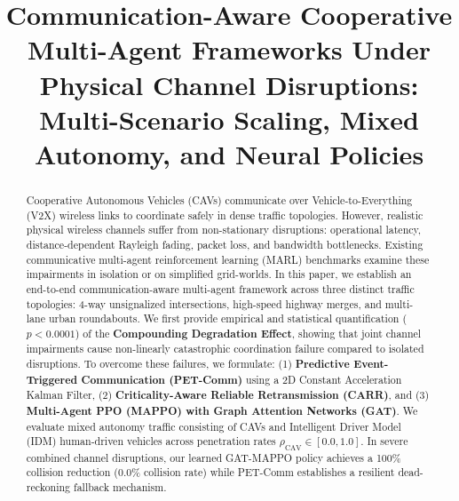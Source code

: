 \documentclass[conference]{IEEEtran}
\begin{document}
\title{Communication-Aware Cooperative Multi-Agent Frameworks Under Physical Channel Disruptions: Multi-Scenario Scaling, Mixed Autonomy, and Neural Policies}

\author{
\and
{}
}

\maketitle

\begin{abstract}
Cooperative Autonomous Vehicles (CAVs) communicate over Vehicle-to-Everything (V2X) wireless links to coordinate safely in dense traffic topologies. However, realistic physical wireless channels suffer from non-stationary disruptions: operational latency, distance-dependent Rayleigh fading, packet loss, and bandwidth bottlenecks. Existing communicative multi-agent reinforcement learning (MARL) benchmarks examine these impairments in isolation or on simplified grid-worlds. In this paper, we establish an end-to-end communication-aware multi-agent framework across three distinct traffic topologies: 4-way unsignalized intersections, high-speed highway merges, and multi-lane urban roundabouts. We first provide empirical and statistical quantification ($p < 0.0001$) of the \textbf{Compounding Degradation Effect}, showing that joint channel impairments cause non-linearly catastrophic coordination failure compared to isolated disruptions. To overcome these failures, we formulate: (1) \textbf{Predictive Event-Triggered Communication (PET-Comm)} using a 2D Constant Acceleration Kalman Filter, (2) \textbf{Criticality-Aware Reliable Retransmission (CARR)}, and (3) \textbf{Multi-Agent PPO (MAPPO) with Graph Attention Networks (GAT)}. We evaluate mixed autonomy traffic consisting of CAVs and Intelligent Driver Model (IDM) human-driven vehicles across penetration rates $\rho_{\text{CAV}} \in [0.0, 1.0]$. In severe combined channel disruptions, our learned GAT-MAPPO policy achieves a 100\% collision reduction (0.0\% collision rate) while PET-Comm establishes a resilient dead-reckoning fallback mechanism.
\end{abstract}
\end{document}
